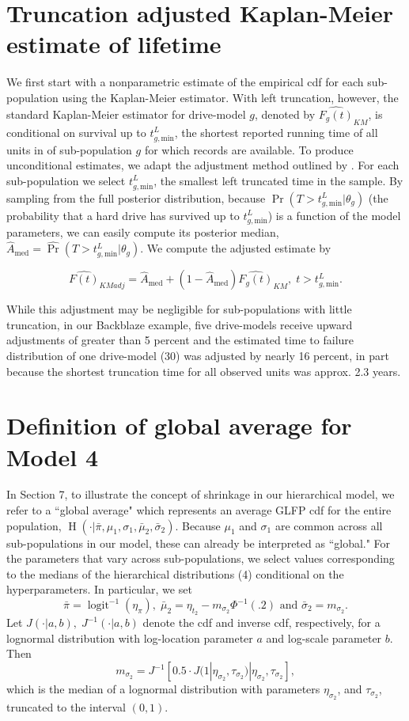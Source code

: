 \documentclass[12pt]{article}
\newcommand{\op}{\operatorname}
\begin{document}
{\appendix
\section{Truncation adjusted Kaplan-Meier estimate of lifetime}
\label{sec:trunc-adj}
We first start with a nonparametric estimate of the empirical cdf for each sub-population using the Kaplan-Meier estimator.  With left truncation, however, the standard Kaplan-Meier estimator for drive-model $g$, denoted by
$\widehat{F_g(t)}_{KM}$, is conditional on survival up to
$t_{g,\text{min}}^L$, the shortest reported running time of all units in
of sub-population $g$ for which records are available. To produce
unconditional estimates, we adapt the adjustment method outlined by \citet[Chapter 11]{meeker}.  For each sub-population we select
$t_{g,\text{min}}^L$, the smallest left truncated time in the sample.
By sampling from the full posterior distribution, because
$\Pr(T>t_{g,\text{min}}^L|\theta_g)$ (the probability that a hard drive has
survived up to $t_{g,\text{min}}^L$) is a function of the model
parameters, we can easily compute its posterior median,
$\widehat{A}_{\text{med}} = \widehat{\Pr}(T>t_{g,\text{min}}^L|\theta_g)$. We compute the adjusted estimate by

$$\widehat{F(t)}_{KMadj} = \widehat{A}_{\text{med}} + \left(1 - \widehat{A}_{\text{med}}\right)\widehat{F_g(t)}_{KM},\; t>t_{g,\text{min}}^L.$$

While this adjustment may be negligible for sub-populations with little truncation, in our Backblaze example, five drive-models receive upward adjustments of greater than 5 percent and the estimated time to failure distribution of one drive-model (30) was adjusted by nearly 16 percent, in part because the shortest truncation time for all observed units was approx. 2.3 years.

\section{Definition of global average for Model 4}
\label{global-avg}
In Section 7, to illustrate the concept of shrinkage in our hierarchical model, we refer to a ``global average" which represents an average GLFP cdf for the entire population, $\op{H}\left(\cdot|\bar{\pi},\mu_1,\sigma_1,\bar{\mu}_2,\bar{\sigma}_2\right)$. Because $\mu_1$ and $\sigma_1$ are common across all sub-populations in our model, these can already be interpreted as ``global." For the parameters that vary across sub-populations, we select values corresponding to the medians of the hierarchical distributions (4) conditional on the hyperparameters. In particular, we set
$$\bar{\pi}=\op{logit}^{-1}(\eta_{\pi}),\;\bar{\mu}_2=\eta_{t_2} - m_{\sigma_2}\Phi^{-1}(.2) \mbox{ and } \bar{\sigma}_2= m_{\sigma_2}.$$
Let $J(\cdot|a,b),\;J^{-1}(\cdot|a,b)$ denote the cdf and inverse cdf, respectively, for a lognormal distribution with log-location parameter $a$ and log-scale parameter $b$. Then
$$m_{\sigma_2}=J^{-1}[0.5 \cdot J(1|\eta_{\sigma_2},\tau_{\sigma_2})|\eta_{\sigma_2}, \tau_{\sigma_2}],$$
which is the median of a lognormal distribution with parameters $\eta_{\sigma_2}$, and $\tau_{\sigma_2}$, truncated to the interval $(0, 1)$.

}
\end{document}
